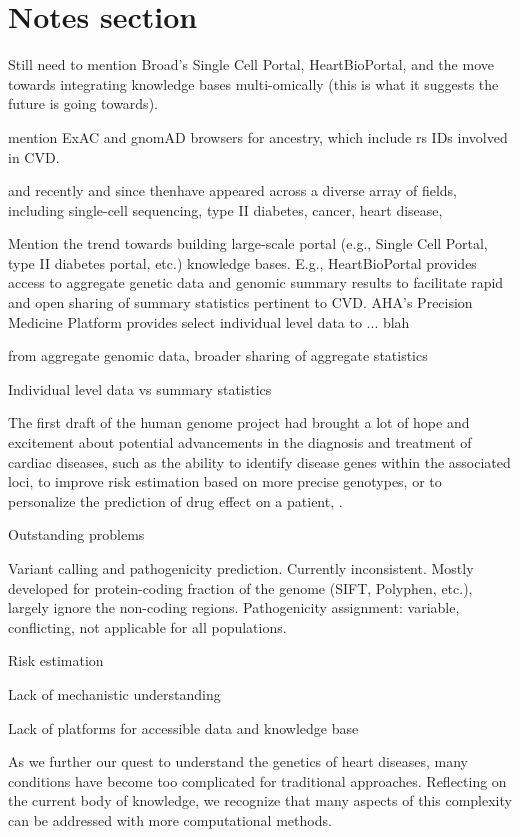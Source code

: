 \documentclass[letter]{bioinfo}
\begin{document}
\newpage
\section*{Notes section}

Still need to mention Broad's Single Cell Portal, HeartBioPortal, and the move towards integrating knowledge bases multi-omically (this is what it suggests the future is going towards).

mention ExAC and gnomAD browsers for ancestry, which include rs IDs involved in CVD.

and recently  and since thenhave appeared across a diverse array of fields, including single-cell sequencing, type II diabetes, cancer, heart disease, 

Mention the trend towards building large-scale portal (e.g., Single Cell Portal, type II diabetes portal, etc.) knowledge bases.  E.g., HeartBioPortal provides access to aggregate genetic data and genomic summary results to facilitate rapid and open sharing of summary statistics pertinent to CVD.  AHA's Precision Medicine Platform provides select individual level data to ... blah

from aggregate genomic data, broader sharing of aggregate statistics

Individual level data vs summary statistics



The first draft of the human genome project had brought a lot of hope and excitement about potential advancements in the diagnosis and treatment of cardiac diseases, such as the ability to identify disease genes within the associated loci, to improve risk estimation based on more precise genotypes, or to personalize the prediction of drug effect on a patient, \citep{Komajda:2001:heart}.


Outstanding problems

Variant calling and pathogenicity prediction. Currently inconsistent. Mostly developed for protein-coding fraction of the genome (SIFT, Polyphen, etc.), largely ignore the non-coding regions.
Pathogenicity assignment: variable, conflicting, not applicable for all populations.

Risk estimation

Lack of mechanistic understanding

Lack of platforms for accessible data and knowledge base


As we further our quest to understand the genetics of heart diseases, many conditions have become too complicated for traditional approaches. Reflecting on the current body of knowledge, we recognize that many aspects of this complexity can be addressed with more computational methods.
\end{document}
